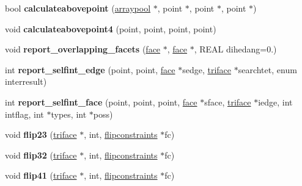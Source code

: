 \begin{DoxyCompactItemize}
\item 
\mbox{\label{classtetgenmesh_a8a8dc5b469308dc2c048f9cfc7d0dd62}} 
bool {\bfseries calculateabovepoint} (\hyperlink{classtetgenmesh_1_1arraypool}{arraypool} $\ast$, point $\ast$, point $\ast$, point $\ast$)
\item 
\mbox{\label{classtetgenmesh_ad6b36879c364072af6adf80fa598af75}} 
void {\bfseries calculateabovepoint4} (point, point, point, point)
\item 
\mbox{\label{classtetgenmesh_a8f497b84bd4664d3a5a0cf5a9fdf5419}} 
void {\bfseries report\+\_\+overlapping\+\_\+facets} (\hyperlink{classtetgenmesh_1_1face}{face} $\ast$, \hyperlink{classtetgenmesh_1_1face}{face} $\ast$, R\+E\+AL dihedang=0.)
\item 
\mbox{\label{classtetgenmesh_a189f56ca5d1481d92d44da6b79c62863}} 
int {\bfseries report\+\_\+selfint\+\_\+edge} (point, point, \hyperlink{classtetgenmesh_1_1face}{face} $\ast$sedge, \hyperlink{classtetgenmesh_1_1triface}{triface} $\ast$searchtet, enum interresult)
\item 
\mbox{\label{classtetgenmesh_a51a904c4af5c5120ed05d48a6717b44d}} 
int {\bfseries report\+\_\+selfint\+\_\+face} (point, point, point, \hyperlink{classtetgenmesh_1_1face}{face} $\ast$sface, \hyperlink{classtetgenmesh_1_1triface}{triface} $\ast$iedge, int intflag, int $\ast$types, int $\ast$poss)
\item 
\mbox{\label{classtetgenmesh_a134475b2c7d8269686cf3d7fbe11183d}} 
void {\bfseries flip23} (\hyperlink{classtetgenmesh_1_1triface}{triface} $\ast$, int, \hyperlink{classtetgenmesh_1_1flipconstraints}{flipconstraints} $\ast$fc)
\item 
\mbox{\label{classtetgenmesh_a42d0630c17e609dc3224975693a992c4}} 
void {\bfseries flip32} (\hyperlink{classtetgenmesh_1_1triface}{triface} $\ast$, int, \hyperlink{classtetgenmesh_1_1flipconstraints}{flipconstraints} $\ast$fc)
\item 
\mbox{\label{classtetgenmesh_a061a1d2f047d12726215eac51c7bb5a1}} 
void {\bfseries flip41} (\hyperlink{classtetgenmesh_1_1triface}{triface} $\ast$, int, \hyperlink{classtetgenmesh_1_1flipconstraints}{flipconstraints} $\ast$fc)

\end{DoxyCompactItemize}
